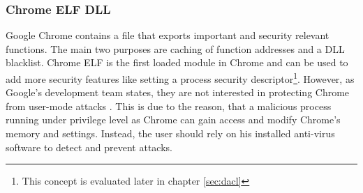 \subsubsection{Chrome ELF DLL}
Google Chrome contains a  file that exports  important and security relevant functions. The main two purposes are caching of function addresses and a \gls{DLL} blacklist. Chrome ELF is the first loaded module in Chrome and can be used to add more security features like setting a process security descriptor\footnote{This concept is evaluated later in chapter \ref{sec:dacl}}. However, as Google's development team states, they are not interested in protecting Chrome from user-mode attacks \cite{chromium_security}. This is due to the reason, that a malicious process running under privilege level as Chrome can gain access and modify Chrome's memory and settings. Instead, the user should rely on his installed anti-virus software to detect and prevent attacks.